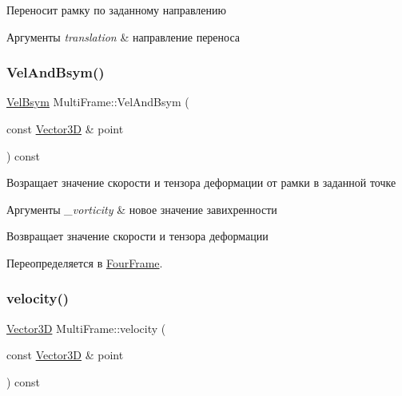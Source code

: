 Переносит рамку по заданному направлению 
\begin{DoxyParams}{Аргументы}
{\em translation} & направление переноса \\
\hline
\end{DoxyParams}
\mbox{\label{class_multi_frame_a60269c2c56aace32bb0fe0a70731a309}} 
\subsubsection{\texorpdfstring{Vel\+And\+Bsym()}{VelAndBsym()}}
{\footnotesize\ttfamily \mbox{\hyperlink{struct_vel_bsym}{Vel\+Bsym}} Multi\+Frame\+::\+Vel\+And\+Bsym (\begin{DoxyParamCaption}\item[{const \mbox{\hyperlink{class_vector3_d}{Vector3D}} \&}]{point }\end{DoxyParamCaption}) const\hspace{0.3cm}{\ttfamily [virtual]}}

Возращает значение скорости и тензора деформации от рамки в заданной точке 
\begin{DoxyParams}{Аргументы}
{\em \+\_\+vorticity} & новое значение завихренности \\
\hline
\end{DoxyParams}
\begin{DoxyReturn}{Возвращает}
значение скорости и тензора деформации 
\end{DoxyReturn}


Переопределяется в \mbox{\hyperlink{class_four_frame_a950100331ec16cb70fc8d89fce01e84f}{Four\+Frame}}.

\mbox{\label{class_multi_frame_a18a1755403fa12c2f59e81078e1dd34e}} 
\subsubsection{\texorpdfstring{velocity()}{velocity()}}
{\footnotesize\ttfamily \mbox{\hyperlink{class_vector3_d}{Vector3D}} Multi\+Frame\+::velocity (\begin{DoxyParamCaption}\item[{const \mbox{\hyperlink{class_vector3_d}{Vector3D}} \&}]{point }\end{DoxyParamCaption}) const\hspace{0.3cm}{\ttfamily [virtual]}}

